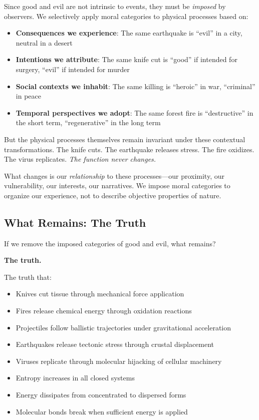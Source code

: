 \documentclass[11pt,a4paper]{article}
\begin{document}
Since good and evil are not intrinsic to events, they must be \emph{imposed} 
by observers. We selectively apply moral categories to physical processes based 
on:

\begin{itemize}[leftmargin=2em]
\item \textbf{Consequences we experience}: The same earthquake is ``evil'' in 
a city, neutral in a desert
\item \textbf{Intentions we attribute}: The same knife cut is ``good'' if 
intended for surgery, ``evil'' if intended for murder
\item \textbf{Social contexts we inhabit}: The same killing is ``heroic'' in 
war, ``criminal'' in peace
\item \textbf{Temporal perspectives we adopt}: The same forest fire is 
``destructive'' in the short term, ``regenerative'' in the long term
\end{itemize}

But the physical processes themselves remain invariant under these contextual 
transformations. The knife cuts. The earthquake releases stress. The fire 
oxidizes. The virus replicates. \emph{The function never changes.}

What changes is our \emph{relationship} to these processes—our proximity, our 
vulnerability, our interests, our narratives. We impose moral categories to 
organize our experience, not to describe objective properties of nature.

\subsection{What Remains: The Truth}

If we remove the imposed categories of good and evil, what remains?

\textbf{The truth.}

The truth that:
\begin{itemize}[leftmargin=2em]
\item Knives cut tissue through mechanical force application
\item Fires release chemical energy through oxidation reactions
\item Projectiles follow ballistic trajectories under gravitational 
acceleration
\item Earthquakes release tectonic stress through crustal displacement
\item Viruses replicate through molecular hijacking of cellular machinery
\item Entropy increases in all closed systems
\item Energy dissipates from concentrated to dispersed forms
\item Molecular bonds break when sufficient energy is applied
\end{itemize}
\end{document}
